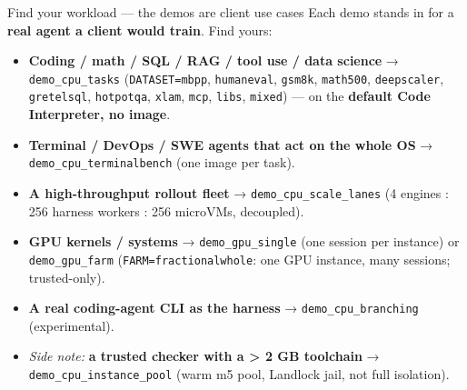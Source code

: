 \documentclass[
  10pt,
  ignorenonframetext,
  aspectratio=169,
  t]{beamer}
\providecommand{\tightlist}{%
  \setlength{\itemsep}{0pt}\setlength{\parskip}{0pt}}
\begin{document}
\begin{frame}{Find your workload --- the demos are client use
cases}
\protect\hypertarget{find-your-workload-the-demos-are-client-use-cases}{}
Each demo stands in for a \textbf{real agent a client would train}. Find
yours:

\begin{itemize}
\tightlist
\item
  \textbf{Coding / math / SQL / RAG / tool use / data science} →
  \texttt{demo\_cpu\_tasks} (\texttt{DATASET=mbpp}, \texttt{humaneval},
  \texttt{gsm8k}, \texttt{math500}, \texttt{deepscaler},
  \texttt{gretelsql}, \texttt{hotpotqa}, \texttt{xlam}, \texttt{mcp},
  \texttt{libs}, \texttt{mixed}) --- on the \textbf{default Code
  Interpreter, no image}.
\item
  \textbf{Terminal / DevOps / SWE agents that act on the whole OS} →
  \texttt{demo\_cpu\_terminalbench} (one image per task).
\item
  \textbf{A high-throughput rollout fleet} →
  \texttt{demo\_cpu\_scale\_lanes} (4 engines : 256 harness workers :
  256 microVMs, decoupled).
\item
  \textbf{GPU kernels / systems} → \texttt{demo\_gpu\_single} (one
  session per instance) or \texttt{demo\_gpu\_farm}
  (\texttt{FARM=fractional\textbar{}whole}: one GPU instance, many
  sessions; trusted-only).
\item
  \textbf{A real coding-agent CLI as the harness} →
  \texttt{demo\_cpu\_branching} (experimental).
\item
  \emph{Side note:} \textbf{a trusted checker with a \textgreater{} 2 GB
  toolchain} → \texttt{demo\_cpu\_instance\_pool} (warm m5 pool,
  Landlock jail, not full isolation).
\end{itemize}
\end{frame}
\end{document}
